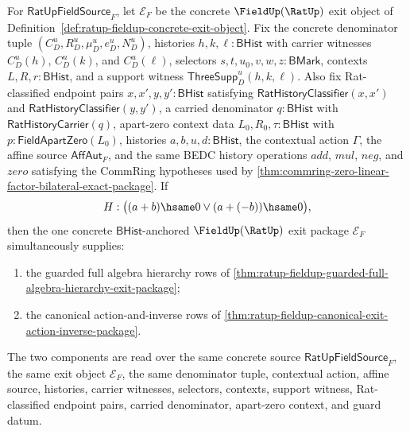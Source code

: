 \begin{theorem}
\label{thm:ratup-fieldup-guarded-canonical-action-inverse-exit-package}
For $\mathsf{RatUpFieldSource}_F$, let $\mathcal E_F$ be the concrete
$\FieldUp(\RatUp)$ exit object of
Definition~\ref{def:ratup-fieldup-concrete-exit-object}. Fix the concrete
denominator tuple $(C_D^u,R_D^u,\mu_D^u,e_D^u,N_D^u)$, histories
$h,k,\ell:\mathsf{BHist}$ with carrier witnesses $C_D^u(h)$, $C_D^u(k)$, and
$C_D^u(\ell)$, selectors $s,t,u_0,v,w,z:\mathsf{BMark}$, contexts
$L,R,r:\mathsf{BHist}$, and a support witness
$\mathsf{ThreeSupp}_D^u(h,k,\ell)$. Also fix Rat-classified endpoint pairs
$x,x',y,y':\mathsf{BHist}$ satisfying
$\mathsf{RatHistoryClassifier}(x,x')$ and
$\mathsf{RatHistoryClassifier}(y,y')$, a carried denominator
$q:\mathsf{BHist}$ with $\mathsf{RatHistoryCarrier}(q)$, apart-zero context
data $L_0,R_0,\tau:\mathsf{BHist}$ with
$p:\mathsf{FieldApartZero}(L_0)$, histories $a,b,u,d:\mathsf{BHist}$, the
contextual action $\Gamma$, the affine source $\mathsf{AffAut}_F$, and the same
BEDC history operations $add$, $mul$, $neg$, and $zero$ satisfying the CommRing
hypotheses used by
\autoref{thm:commring-zero-linear-factor-bilateral-exact-package}. If
$$
H:\bigl((a+b)\hsame0 \lor (a+(-b))\hsame0\bigr),
$$
then the one concrete $\mathsf{BHist}$-anchored $\FieldUp(\RatUp)$ exit package
$\mathcal E_F$ simultaneously supplies:
\begin{enumerate}
  \item the guarded full algebra hierarchy rows of
  \autoref{thm:ratup-fieldup-guarded-full-algebra-hierarchy-exit-package};
  \item the canonical action-and-inverse rows of
  \autoref{thm:ratup-fieldup-canonical-exit-action-inverse-package}.
\end{enumerate}
The two components are read over the same concrete source
$\mathsf{RatUpFieldSource}_F$, the same exit object $\mathcal E_F$, the same
denominator tuple, contextual action, affine source, histories, carrier
witnesses, selectors, contexts, support witness, Rat-classified endpoint pairs,
carried denominator, apart-zero context, and guard datum.
\end{theorem}
